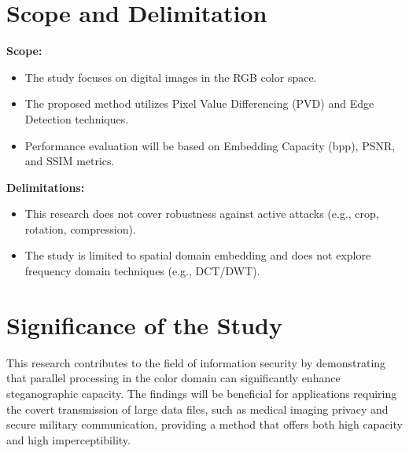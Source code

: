 \section{Scope and Delimitation}
\textbf{Scope:}
\begin{itemize}
    \item The study focuses on digital images in the RGB color space.
    \item The proposed method utilizes Pixel Value Differencing (PVD) and Edge Detection techniques.
    \item Performance evaluation will be based on Embedding Capacity (bpp), PSNR, and SSIM metrics.
\end{itemize}

\textbf{Delimitations:}
\begin{itemize}
    \item This research does not cover robustness against active attacks (e.g., crop, rotation, compression).
    \item The study is limited to spatial domain embedding and does not explore frequency domain techniques (e.g., DCT/DWT).
\end{itemize}

\section{Significance of the Study}
This research contributes to the field of information security by demonstrating that parallel processing in the color domain can significantly enhance steganographic capacity. The findings will be beneficial for applications requiring the covert transmission of large data files, such as medical imaging privacy and secure military communication, providing a method that offers both high capacity and high imperceptibility.
